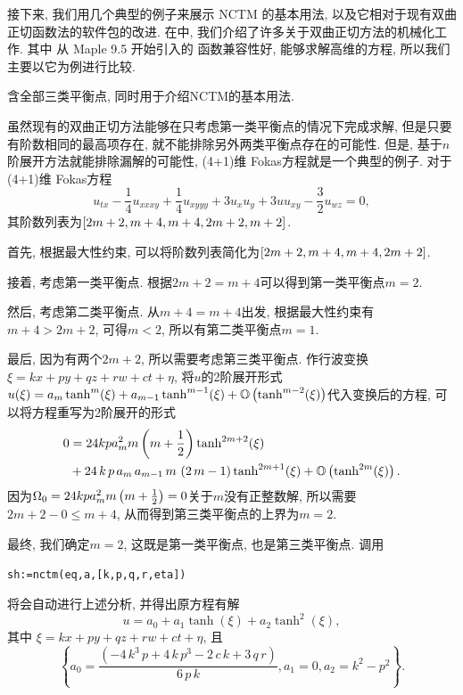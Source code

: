 接下来, 我们用几个典型的例子来展示 NCTM 的基本用法, 以及它相对于现有双曲正切函数法的软件包的改进. 在中, 我们介绍了许多关于双曲正切方法的机械化工作. 其中 从 Maple 9.5 开始引入的  函数兼容性好, 能够求解高维的方程, 所以我们主要以它为例进行比较. 

\begin{example}含全部三类平衡点, 同时用于介绍NCTM的基本用法. 

虽然现有的双曲正切方法能够在只考虑第一类平衡点的情况下完成求解, 但是只要有阶数相同的最高项存在, 就不能排除另外两类平衡点存在的可能性. 但是, 基于$n$阶展开方法就能排除漏解的可能性, (4+1)维 Fokas方程就是一个典型的例子. 对于(4+1)维 Fokas方程\CITEdaFokas{}
\begin{equation}
    u_{tx}-\frac{1}{4}u_{xxxy}+\frac{1}{4}u_{xyyy}+3u_xu_y+3uu_{xy}-\frac{3}{2}u_{wz}=0 ,
\end{equation}
其阶数列表为$\left[2m+2,m+4,m+4,2m+2,m+2\right]$. 
\begin{compactitem}[\textbullet]
\item 首先, 根据最大性约束, 可以将阶数列表简化为$\left[2m+2,m+4,m+4,2m+2\right]$.
\item 接着, 考虑第一类平衡点. 根据$2m+2=m+4$可以得到第一类平衡点$m=2$.
\item 然后, 考虑第二类平衡点. 从$m+4=m+4$出发, 根据最大性约束有$m+4>2m+2$, 可得$m<2$, 所以有第二类平衡点$m=1$.
\item 最后, 因为有两个$2m+2$, 所以需要考虑第三类平衡点. 作行波变换$\xi=kx+py+qz+rw+ct+\eta$, 将$u$的2阶展开形式$u(\xi)=a_m\tanh^m(\xi)+a_{m-1}\tanh^{m-1}(\xi)+\mathbb O\left(\tanh^{m-2}(\xi)\right)$代入变换后的方程, 可以将方程重写为2阶展开的形式
\begin{equation}
\begin{aligned}
0&=24kpa_m^2m\left(m+\frac{1}{2}\right)\tanh^{2m+2}(\xi)\\ 
&+24\,k\,p\,{{a}_{m}}\,{{a}_{m-1}}\,m\,\left( 2\,m-1\right)\tanh^{2m+1}(\xi)+\mathbb O\left(\tanh^{2m}(\xi)\right) . 
\end{aligned}
\end{equation}
因为$\Omega_0=24kpa_m^2m\left(m+\frac{1}{2}\right)=0$关于$m$没有正整数解, 所以需要$2m+2-0\le m+4$, 从而得到第三类平衡点的上界为$m=2$.
\end{compactitem}
   
最终, 我们确定$m=2$, 这既是第一类平衡点, 也是第三类平衡点. 调用
\begin{verbatim}
sh:=nctm(eq,a,[k,p,q,r,eta])
\end{verbatim}
将会自动进行上述分析, 并得出原方程有解
\begin{equation}
    u=a_0 +a_1 \tanh(\xi) + a_2 \tanh^2(\xi), 
\end{equation}
其中 $\xi=kx+py+qz+rw+ct+\eta$, 且
\begin{equation}
    \left\{ {{a}_{0}}=\frac{\left( -4\,{k}^{3}\,p+4\,k\,{p}^{3}-2\,c\,k+3\,q\,r\right) }{6\,p\,k},{{a}_{1}}=0,{{a}_{2}}={k}^{2}-{p}^{2}\right\} . \label{nctm-fokas-sol}
\end{equation}


\end{example}
